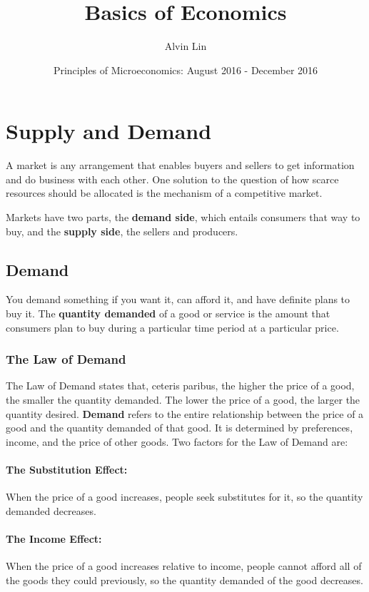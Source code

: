 \documentclass{article}
\title{Basics of Economics}
\author{Alvin Lin}
\date{Principles of Microeconomics: August 2016 - December 2016}
\begin{document}
\maketitle

\section{Supply and Demand}
A market is any arrangement that enables buyers and sellers to get information
and do business with each other. One solution to the question of how scarce
resources should be allocated is the mechanism of a competitive market. \par
Markets have two parts, the \textbf{demand side}, which entails consumers
that way to buy, and the \textbf{supply side}, the sellers and producers.

\subsection{Demand}
You demand something if you want it, can afford it, and have definite plans to
buy it. The \textbf{quantity demanded} of a good or service is the amount that
consumers plan to buy during a particular time period at a particular price.

\subsubsection{The Law of Demand}
The Law of Demand states that, ceteris paribus, the higher the price
of a good, the smaller the quantity demanded. The lower the price of a good,
the larger the quantity desired. \textbf{Demand} refers to the entire
relationship between the price of a good and the quantity demanded of that
good. It is determined by preferences, income, and the price of other goods.
Two  factors for the Law of Demand are:

\paragraph{The Substitution Effect:}
When the price of a good increases, people seek substitutes for it, so the
quantity demanded decreases.

\paragraph{The Income Effect:}
When the price of a good increases relative to income, people cannot afford all
of the goods they could previously, so the quantity demanded of the good
decreases.
\end{document}
